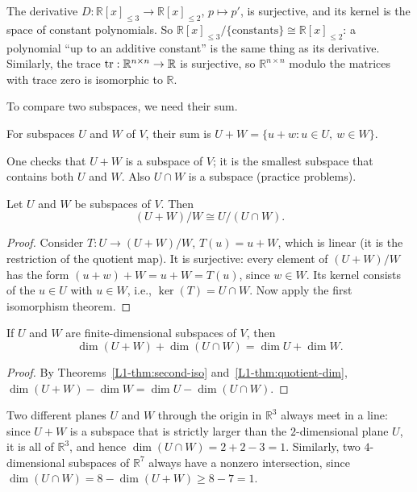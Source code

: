\begin{example}
    The derivative $D: \mathbb{R}[x]_{\leq 3} \to \mathbb{R}[x]_{\leq 2}$, $p \mapsto p'$, is surjective, and its kernel is the space of constant polynomials. So $\mathbb{R}[x]_{\leq 3}/\{\text{constants}\} \cong \mathbb{R}[x]_{\leq 2}$: a polynomial ``up to an additive constant'' is the same thing as its derivative. Similarly, the trace $\operatorname{tr}: \mathbb{R}^{n \times n} \to \mathbb{R}$ is surjective, so $\mathbb{R}^{n \times n}$ modulo the matrices with trace zero is isomorphic to $\mathbb{R}$.
\end{example}

To compare two subspaces, we need their sum.

\begin{definition}
    For subspaces $U$ and $W$ of $V$, their sum is $U + W = \{u + w : u \in U, \ w \in W\}$.
\end{definition}

One checks that $U + W$ is a subspace of $V$; it is the smallest subspace that contains both $U$ and $W$. Also $U \cap W$ is a subspace (practice problems).

\begin{theorem}\label{L1-thm:second-iso}
    Let $U$ and $W$ be subspaces of $V$. Then
    \[(U + W)/W \cong U/(U \cap W).\]
\end{theorem}

\begin{proof}
    Consider $T: U \to (U + W)/W$, $T(u) = u + W$, which is linear (it is the restriction of the quotient map). It is surjective: every element of $(U + W)/W$ has the form $(u + w) + W = u + W = T(u)$, since $w \in W$. Its kernel consists of the $u \in U$ with $u \in W$, i.e., $\ker(T) = U \cap W$. Now apply the first isomorphism theorem.
\end{proof}

\begin{corollary}\label{L1-cor:grassmann}
    If $U$ and $W$ are finite-dimensional subspaces of $V$, then
    \[\dim(U + W) + \dim(U \cap W) = \dim U + \dim W.\]
\end{corollary}

\begin{proof}
    By Theorems~\ref{L1-thm:second-iso} and~\ref{L1-thm:quotient-dim}, $\dim(U + W) - \dim W = \dim U - \dim(U \cap W)$.
\end{proof}

\begin{example}
    Two different planes $U$ and $W$ through the origin in $\mathbb{R}^3$ always meet in a line: since $U + W$ is a subspace that is strictly larger than the $2$-dimensional plane $U$, it is all of $\mathbb{R}^3$, and hence $\dim(U \cap W) = 2 + 2 - 3 = 1$. Similarly, two $4$-dimensional subspaces of $\mathbb{R}^7$ always have a nonzero intersection, since $\dim(U \cap W) = 8 - \dim(U + W) \geq 8 - 7 = 1$.
\end{example}

